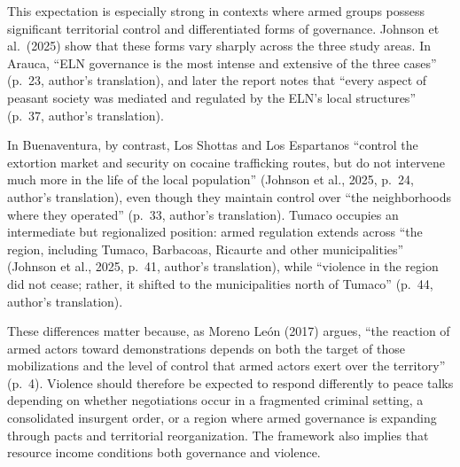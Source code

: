 \documentclass[11pt]{article}
\begin{document}
This expectation is especially strong in contexts where armed groups possess significant territorial control and differentiated forms of governance. Johnson et al.~(2025) show that these forms vary sharply across the three study areas. In Arauca, ``ELN governance is the most intense and extensive of the three cases'' (p.~23, author's translation), and later the report notes that ``every aspect of peasant society was mediated and regulated by the ELN's local structures'' (p. 37, author's translation). 

In Buenaventura, by contrast, Los Shottas and Los Espartanos ``control the extortion market and security on cocaine trafficking routes, but do not intervene much more in the life of the local population'' (Johnson et al., 2025, p. 24, author's translation), even though they maintain control over ``the neighborhoods where they operated'' (p. 33, author's translation). Tumaco occupies an intermediate but regionalized position: armed regulation extends across ``the region, including Tumaco, Barbacoas, Ricaurte and other municipalities'' (Johnson et al., 2025, p. 41, author's translation), while ``violence in the region did not cease; rather, it shifted to the municipalities north of Tumaco'' (p. 44, author's translation). 

These differences matter because, as Moreno León (2017) argues, ``the reaction of armed actors toward demonstrations depends on both the target of those mobilizations and the level of control that armed actors exert over the territory'' (p. 4). Violence should therefore be expected to respond differently to peace talks depending on whether negotiations occur in a fragmented criminal setting, a consolidated insurgent order, or a region where armed governance is expanding through pacts and territorial reorganization. The framework also implies that resource income conditions both governance and violence. 
\end{document}
